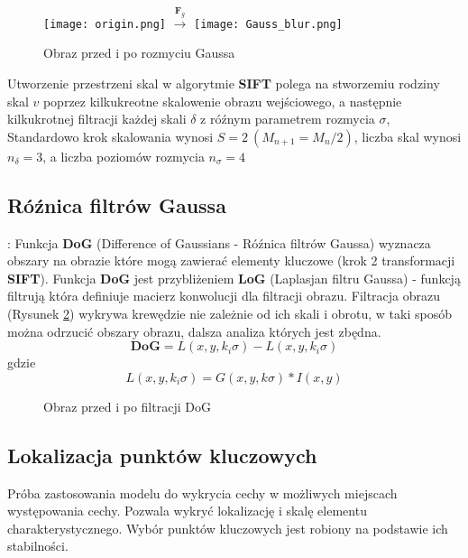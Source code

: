    \begin{figure}[h]
      \centering
      \texttt{[image: origin.png]}
      \Large{$ \xrightarrow{\mathbf{F}_{g}} $}
      \texttt{[image: Gauss\_blur.png]}
      \caption{Obraz przed i po rozmyciu Gaussa}
      \label {fig:gauss_blur}
   \end{figure}

   Utworzenie przestrzeni skal w algorytmie \textbf{SIFT} polega na stworzemiu rodziny skal $v$ poprzez kilkukreotne skalowenie obrazu wejściowego, a następnie kilkukrotnej filtracji każdej skali $\delta$ z róźnym parametrem rozmycia $\sigma$,
   Standardowo krok skalowania wynosi $ S = 2 \: (M_{n+1} = M_{n} / 2)$, liczba skal wynosi $ n_{\delta} = 3$, a liczba poziomów rozmycia $ n_{\sigma} = 4$

\subsection{Róźnica filtrów Gaussa}:
   Funkcja \textbf{DoG} (Difference of Gaussians - Róźnica filtrów Gaussa) wyznacza obszary na obrazie które mogą zawierać elementy kluczowe (krok 2 transformacji \textbf{SIFT}). Funkcja \textbf{DoG} jest przybliżeniem \textbf{LoG} (Laplasjan filtru Gaussa) - funkcją filtrują która definiuje macierz konwolucji dla filtracji obrazu. Filtracja obrazu (Rysunek \ref{fig:DoG})  wykrywa krewędzie nie zależnie od ich skali i obrotu, w taki sposób można odrzucić obszary obrazu, dalsza analiza których jest zbędna.
   \begin{equation} \label{eq:DoG}
      \mathbf{DoG} = L(x, y, k_i \sigma) - L(x, y, k_i \sigma)
   \end{equation}
   gdzie
   \begin{equation} \label{eq:DoG_}
      L(x, y, k_i \sigma) = G(x, y, k\sigma) * I(x, y)
   \end{equation}

   \begin{figure}[h]
      \centering
      \smallskip{ }
      \smallskip{ }
   \caption{Obraz przed i po filtracji DoG}
   \label {fig:DoG}
   \end{figure}



\subsection{Lokalizacja punktów kluczowych}
      Próba zastosowania modelu do wykrycia cechy w możliwych miejscach występowania cechy. Pozwala wykryć lokalizację i skalę elementu charakterystycznego. Wybór punktów kluczowych jest robiony na podstawie ich stabilności.

